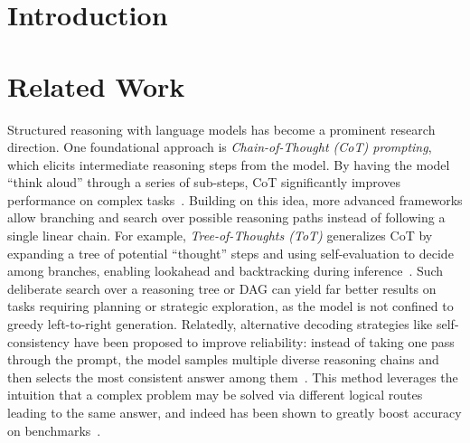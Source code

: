 \documentclass{article}
\theoremstyle{plain}
\theoremstyle{definition}
\theoremstyle{remark}
\begin{document}

\printAffiliationsAndNotice{}

\begin{abstract}
\end{abstract}

\section{Introduction}

\section{Related Work}

Structured reasoning with language models has become a prominent research direction. One foundational approach is \emph{Chain-of-Thought (CoT) prompting}, which elicits intermediate reasoning steps from the model. By having the model ``think aloud'' through a series of sub-steps, CoT significantly improves performance on complex tasks~\cite{wei2022chain}. Building on this idea, more advanced frameworks allow branching and search over possible reasoning paths instead of following a single linear chain. For example, \emph{Tree-of-Thoughts (ToT)} generalizes CoT by expanding a tree of potential ``thought'' steps and using self-evaluation to decide among branches, enabling lookahead and backtracking during inference~\cite{yao2023tree}. Such deliberate search over a reasoning tree or DAG can yield far better results on tasks requiring planning or strategic exploration, as the model is not confined to greedy left-to-right generation. Relatedly, alternative decoding strategies like self-consistency have been proposed to improve reliability: instead of taking one pass through the prompt, the model samples multiple diverse reasoning chains and then selects the most consistent answer among them~\cite{wang2022selfconsistency}. This method leverages the intuition that a complex problem may be solved via different logical routes leading to the same answer, and indeed has been shown to greatly boost accuracy on benchmarks~\cite{wang2022selfconsistency}.
\end{document}
